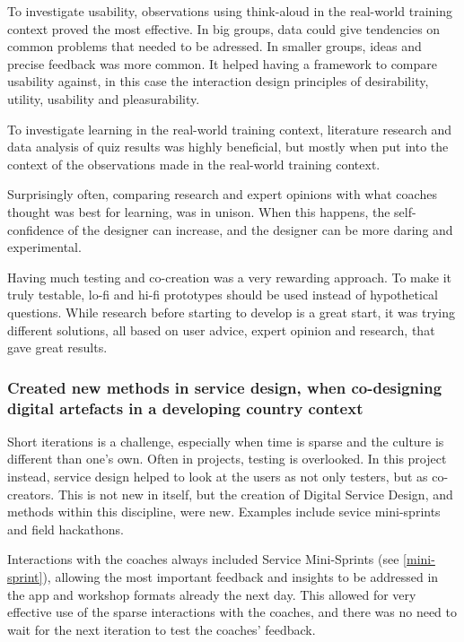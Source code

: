 To investigate usability, observations using think-aloud in the real-world training context proved the most effective. In big groups, data could give tendencies on common problems that needed to be adressed. In smaller groups, ideas and precise feedback was more common. It helped having a framework to compare usability against, in this case the interaction design principles of desirability, utility, usability and pleasurability.

To investigate learning in the real-world training context, literature research and data analysis of quiz results was highly beneficial, but mostly when put into the context of the observations made in the real-world training context.

Surprisingly often, comparing research and expert opinions with what coaches thought was best for learning, was in unison. When this happens, the self-confidence of the designer can increase, and the designer can be more daring and experimental.

Having much testing and co-creation was a very rewarding approach. To make it truly testable, lo-fi and hi-fi prototypes should be used instead of hypothetical questions. While research before starting to develop is a great start, it was trying different solutions, all based on user advice, expert opinion and research, that gave great results.

\subsubsection{Created new methods in service design, when co-designing digital artefacts in a developing country context}
Short iterations is a challenge, especially when time is sparse and the culture is different than one's own. Often in projects, testing is overlooked. In this project instead, service design helped to look at the users as not only testers, but as co-creators. This is not new in itself, but the creation of Digital Service Design, and methods within this discipline, were new. Examples include sevice mini-sprints and field hackathons.

Interactions with the coaches always included Service Mini-Sprints (see \ref{mini-sprint}), allowing the most important feedback and insights to be addressed in the app and workshop formats already the next day. This allowed for very effective use of the sparse interactions with the coaches, and there was no need to wait for the next iteration to test the coaches' feedback.

